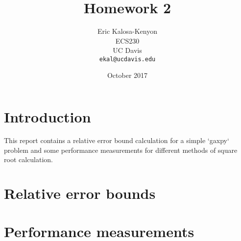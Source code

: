 \documentclass[12pt,fleqn,leqno,letterpaper]{article}
\title{Homework 2}
\author{Eric Kalosa-Kenyon\\
\small{ECS230}\\
\small{UC Davis}\\
\small{\texttt{ekal@ucdavis.edu}}
}
\date{October 2017}
\begin{document}
\maketitle



% 


\section{Introduction}
This report contains a relative error bound calculation for a simple `gaxpy`
problem and some performance measurements for different methods of square root
calculation.

\section{Relative error bounds}

\section{Performance measurements}


% 
\end{document}
